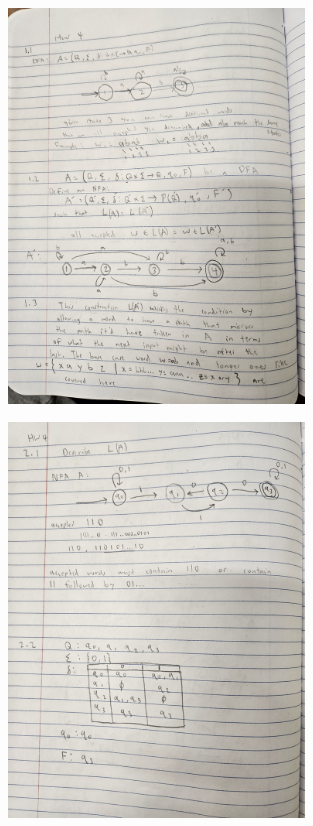 \documentclass{article}
\theoremstyle{theorem}
\theoremstyle{definition}
\theoremstyle{remark}
\begin{document}
\begin{figure}[H]
    \centering
    \includegraphics[angle=-90, width=0.7\textwidth]{latexImages/hw4-1.1.jpg} 
\end{figure}

\begin{figure}[H]
    \centering
    \includegraphics[angle=-90, width=0.7\textwidth]{latexImages/hw4-2.1.jpg} 
\end{figure}
\end{document}
